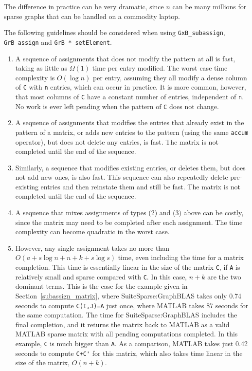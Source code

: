 \documentclass[12pt]{article}
\begin{document}
The difference in practice can be very dramatic, since $n$ can be many millions
for sparse graphs that can be handled on a commodity laptop.

\newpage
The following guidelines should be considered when using
\verb'GxB_subassign', \verb'GrB_assign' and \verb'GrB_*_setElement'.

\begin{enumerate}

\item A sequence of assignments that does not modify the pattern at all is
fast, taking as little as $\Omega(1)$ time per entry modified.  The worst case
time complexity is $O(\log n)$ per entry, assuming they all modify a dense
column of \verb'C' with \verb'n' entries, which can occur in practice.  It is
more common, however, that most columns of \verb'C' have a constant number of
entries, independent of \verb'n'.  No work is ever left pending when the
pattern of \verb'C' does not change.

\item A sequence of assignments that modifies the entries that already exist in
the pattern of a matrix, or adds new entries to the pattern (using the same
\verb'accum' operator), but does not delete any entries, is fast.  The matrix
is not completed until the end of the sequence.

\item Similarly, a sequence that modifies existing entries, or deletes them,
but does not add new ones, is also fast.  This sequence can also repeatedly
delete pre-existing entries and then reinstate them and still be fast.  The
matrix is not completed until the end of the sequence.

\item A sequence that mixes assignments of types (2) and (3) above can be
costly, since the matrix may need to be completed after each assignment.  The
time complexity can become quadratic in the worst case.

\item However, any single assignment takes no more than $O (a + s \log n + n +
k + s \log s )$ time, even including the time for a matrix completion.  This
time is essentially linear in the size of the matrix \verb'C', if \verb'A' is
relatively small and sparse compared with \verb'C'.  In this case, $n+k$ are
the two dominant terms.  This is the case for the example given in
Section~\ref{subassign_matrix}, where SuiteSparse:GraphBLAS takes only 0.74
seconds to compute \verb'C(I,J)=A' just once, where MATLAB takes 87 seconds for
the same computation.  The time for SuiteSparse:GraphBLAS includes the final
completion, and it returns the matrix back to MATLAB as a valid MATLAB sparse
matrix with all pending computations completed.  In this example, \verb'C' is
much bigger than \verb'A'.  As a comparison, MATLAB takes just 0.42 seconds to
compute \verb"C+C'" for this matrix, which also takes time linear in the size
of the matrix, $O(n+k)$.


\end{enumerate}
\end{document}
